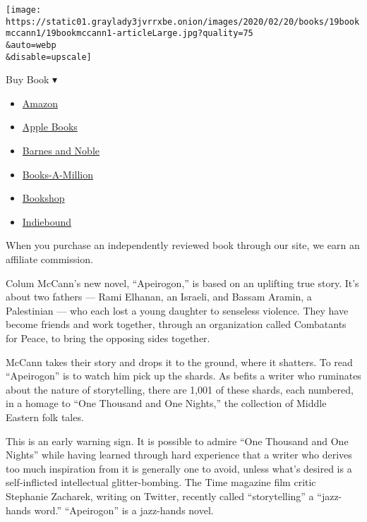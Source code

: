 \texttt{[image: https://static01.graylady3jvrrxbe.onion/images/2020/02/20/books/19bookmccann1/19bookmccann1-articleLarge.jpg?quality=75\\\&auto=webp\\\&disable=upscale]}

Buy Book ▾

\begin{itemize}
\tightlist
\item
  \href{https://www.amazon.com/gp/search?index=books\&tag=NYTBSREV-20\&field-keywords=Apeirogon+Colum+McCann}{Amazon}
\item
  \href{https://du-gae-books-dot-nyt-du-prd.appspot.com/buy?title=Apeirogon\&author=Colum+McCann}{Apple
  Books}
\item
  \href{https://www.anrdoezrs.net/click-7990613-11819508?url=https\%3A\%2F\%2Fwww.barnesandnoble.com\%2Fw\%2F\%3Fean\%3D9781400069606}{Barnes
  and Noble}
\item
  \href{https://www.anrdoezrs.net/click-7990613-35140?url=https\%3A\%2F\%2Fwww.booksamillion.com\%2Fp\%2FApeirogon\%2FColum\%2BMcCann\%2F9781400069606}{Books-A-Million}
\item
  \href{https://bookshop.org/a/3546/9781400069606}{Bookshop}
\item
  \href{https://www.indiebound.org/book/9781400069606?aff=NYT}{Indiebound}
\end{itemize}

When you purchase an independently reviewed book through our site, we
earn an affiliate commission.

Colum McCann's new novel, ``Apeirogon,'' is based on an uplifting true
story. It's about two fathers --- Rami Elhanan, an Israeli, and Bassam
Aramin, a Palestinian --- who each lost a young daughter to senseless
violence. They have become friends and work together, through an
organization called Combatants for Peace, to bring the opposing sides
together.

McCann takes their story and drops it to the ground, where it shatters.
To read ``Apeirogon'' is to watch him pick up the shards. As befits a
writer who ruminates about the nature of storytelling, there are 1,001
of these shards, each numbered, in a homage to ``One Thousand and One
Nights,'' the collection of Middle Eastern folk tales.

This is an early warning sign. It is possible to admire ``One Thousand
and One Nights'' while having learned through hard experience that a
writer who derives too much inspiration from it is generally one to
avoid, unless what's desired is a self-inflicted intellectual
glitter-bombing. The Time magazine film critic Stephanie Zacharek,
writing on Twitter, recently called ``storytelling'' a ``jazz-hands
word.'' ``Apeirogon'' is a jazz-hands novel.

